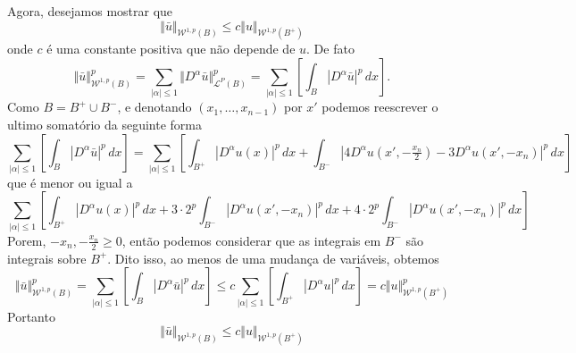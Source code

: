 \documentclass[a4paper, 11pt]{book}
\theoremstyle{definition}
\newcommand{\cL}{\mathcal{L}}
\newcommand{\cW}{\mathcal{W}}
\begin{document}
\begin{prf}
    Agora, desejamos mostrar que
    \begin{equation} \label{eq:desigualdade-B-Bmais}
        \Vert \bar u \Vert_{\cW^{1,p}(B)} \leqslant c \Vert u \Vert_{\cW^{1,p}(B^+)}
    \end{equation}
    onde $c$ é uma constante positiva que não depende de $u$.
    De fato
    \[
        \Vert \bar u \Vert_{\cW^{1,p}(B)}^p = \sum_{|\alpha| \leqslant 1} \Vert D^\alpha\bar u \Vert_{\cL^P(B)}^p = \sum_{|\alpha| \leqslant 1} \left[\int_B |D^\alpha \bar u| ^p \,dx\right].
    \]
    Como $B = B^+ \cup B^-$, e denotando $(x_1,\dots,x_{n-1})$ por $x'$ podemos reescrever o ultimo somatório da seguinte forma
    \[
        \sum_{|\alpha| \leqslant 1} \left[\int_B |D^\alpha \bar u| ^p \,dx\right] = \sum_{|\alpha| \leqslant 1} \left[ \int_{B^+} |D^\alpha u(x)|^p \,dx + \int_{B^-} |4D^\alpha u(x',-\tfrac{x_n}{2}) - 3D^\alpha u(x',-x_n) |^p \,dx \right]
    \]
    que é menor ou igual a
    \[
        \sum_{|\alpha| \leqslant 1} \left[ \int_{B^+} |D^\alpha u(x)|^p \,dx + 3 \cdot 2^p\int_{B^-} |D^\alpha u(x',-x_n)|^p \,dx + 4 \cdot 2^p\int_{B^-} |D^\alpha u(x',-x_n)|^p \,dx   \right] 
    \]
    Porem, $-x_n, -\tfrac{x_n}{2} \geqslant 0$, então podemos considerar que as integrais em $B^-$ são integrais sobre $B^+$. Dito isso, ao menos de uma mudança de variáveis, obtemos
    \[
        \Vert \bar u \Vert_{\cW^{1,p}(B)}^p = \sum_{|\alpha| \leqslant 1} \left[\int_B |D^\alpha \bar u| ^p \,dx\right] \leqslant c\sum_{|\alpha| \leqslant 1} \left[ \int_{B^+}|D^\alpha u|^p \,dx \right] = c \Vert u \Vert_{\cW^{1,p}(B^+)}^p
    \]
    Portanto
    \[
        \Vert \bar u \Vert_{\cW^{1,p}(B)} \leqslant c \Vert u \Vert_{\cW^{1,p}(B^+)}
    \]


\end{prf}
\end{document}
